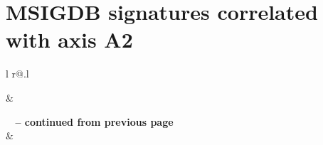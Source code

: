 \chapter{\texorpdfstring{\acrshort{MSIGDB}}{MSIGDB} signatures correlated with axis A2}
\label{app:sigs-msigdb-corrs-axis2}
\begin{longtable}[!htbp]{ l r@{.}l }
\caption[\texorpdfstring{\acrshort{MSIGDB}}{MSIGDB} signatures correlated with axis A2]{\acrshort{MSIGDB} signatures substantially correlated with activity of the prognostic axis A2.}

\hline {} &  \\ \hline
\endfirsthead

{{\bfseries \tablename\ \thetable{} -- continued from previous page}} \\
\hline {} &  \\ \hline
\endhead

\hline {} \\
\endfoot

\hline \hline
\endlastfoot


\end{longtable}
